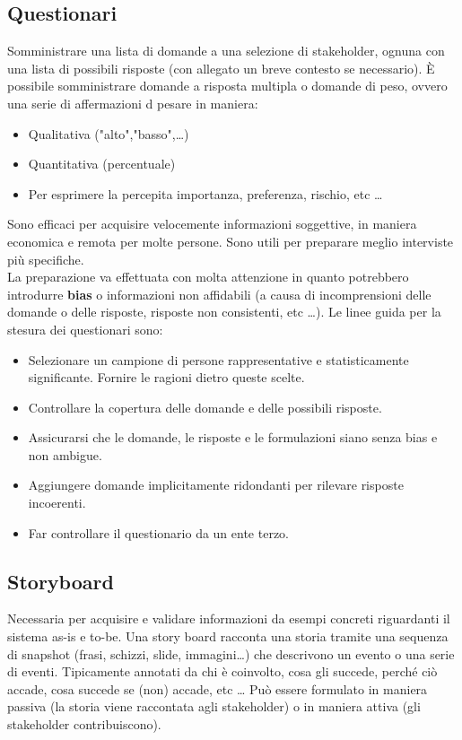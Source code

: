 \documentclass[../main.tex]{subfiles}
\begin{document}
\subsection{Questionari}
Somministrare una lista di domande a una selezione di stakeholder, ognuna con una lista di possibili risposte (con allegato un breve contesto se necessario).
È possibile somministrare domande a risposta multipla o domande di peso, ovvero una serie di affermazioni d pesare in maniera:
\begin{itemize}
	\item Qualitativa ("alto","basso",\dots)
	\item Quantitativa (percentuale)
	\item Per esprimere la percepita importanza, preferenza, rischio, etc \dots
\end{itemize}
Sono efficaci per acquisire velocemente informazioni soggettive, in maniera economica e remota per molte persone.
Sono utili per preparare meglio interviste più specifiche.
\\
La preparazione va effettuata con molta attenzione in quanto potrebbero introdurre \textbf{bias} o informazioni non affidabili (a causa di incomprensioni delle domande o delle risposte, risposte non consistenti, etc \dots).
Le linee guida per la stesura dei questionari sono:
\begin{itemize}
	\item Selezionare un campione di persone rappresentative e statisticamente significante. Fornire le ragioni dietro queste scelte.
	\item Controllare la copertura delle domande e delle possibili risposte.
	\item Assicurarsi che le domande, le risposte e le formulazioni siano senza bias e non ambigue.
	\item Aggiungere domande implicitamente ridondanti per rilevare risposte incoerenti.
	\item Far controllare il questionario da un ente terzo.
\end{itemize}
\subsection{Storyboard}
Necessaria per acquisire e validare informazioni da esempi concreti riguardanti il sistema as-is e to-be.
Una story board racconta una storia tramite una sequenza di snapshot (frasi, schizzi, slide, immagini\dots) che descrivono un evento o una serie di eventi. Tipicamente annotati da chi è coinvolto, cosa gli succede, perché ciò accade, cosa succede se (non) accade, etc \dots
Può essere formulato in maniera passiva (la storia viene raccontata agli stakeholder) o in maniera attiva (gli stakeholder contribuiscono).
\end{document}
